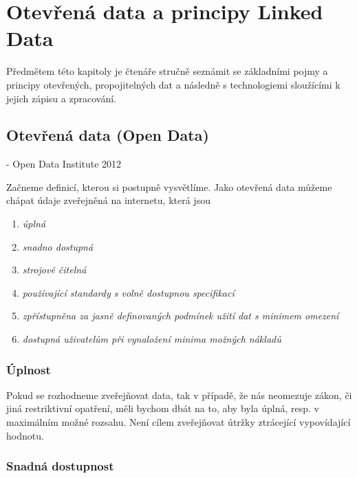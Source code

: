 \chapter{Otevřená data a principy Linked Data}
\label{sec:kap2}

Předmětem této kapitoly je čtenáře stručně seznámit se základními pojmy a principy otevřených, propojitelných dat a následně s technologiemi sloužícími k jejich zápisu a zpracování.

\section[Otevřená data (Open Data)]{Otevřená data (Open Data)\cite{howtoopendata, odgov_s}}

\textit{} - Open Data Institute 2012
\newline

Začneme definicí, kterou si postupně vysvětlíme. Jako otevřená data můžeme chápat údaje zveřejněná na internetu, která jsou 

\begin{enumerate}
\item \textit{úplná}
\item \textit{snadno dostupná}
\item \textit{strojově čitelná}
\item \textit{používající standardy s volně dostupnou specifikací}
\item \textit{zpřístupněna za jasně definovaných podmínek užití dat s minimem omezení}
\item \textit{dostupná uživatelům při vynaložení minima možných nákladů}\cite{mv}
\end{enumerate}

\subsection*{Úplnost}

Pokud se rozhodneme zveřejňovat data, tak v případě, že nás neomezuje zákon, či jiná restriktivní opatření, měli bychom dbát na to, aby byla úplná, resp. v maximálním možné rozsahu. Není cílem zveřejňovat útržky ztrácející vypovídající hodnotu.

\subsection*{Snadná dostupnost}

